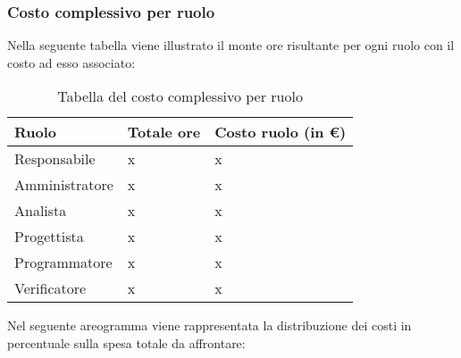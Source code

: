 \subsubsection{Costo complessivo per ruolo}
Nella seguente tabella viene illustrato il monte ore risultante per ogni ruolo con il costo ad esso associato:
{
\renewcommand{\arraystretch}{2}
\begin{longtable}{ C{3cm} C{2cm} C{4cm}}
\caption{Tabella del costo complessivo per ruolo}\\
\rowcolor{\primaryColor}

\textcolor{\secondaryColor}{\textbf{Ruolo}} & 
\textcolor{\secondaryColor}{\textbf{Totale ore}} & 
\textcolor{\secondaryColor}{\textbf{Costo ruolo (in \euro{})}}\\	
\endhead
        
Responsabile   &  x & x \\
Amministratore &  x & x \\
Analista       &  x & x \\
Progettista    &  x & x \\
Programmatore  &  x & x \\
Verificatore   &  x & x \\
        	
\end{longtable}
}


Nel seguente areogramma viene rappresentata la distribuzione dei costi in percentuale sulla spesa totale da affrontare:
\begin{center}
\end{center}

